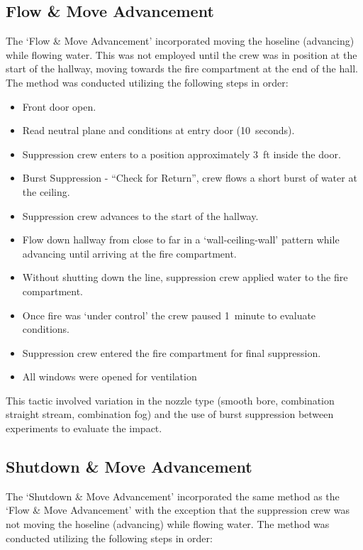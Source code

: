 \documentclass[12pt,oneside]{book}
\begin{document}
\subsection{Flow \& Move Advancement}
The `Flow \& Move Advancement' incorporated moving the hoseline (advancing) while flowing water. This was not employed until the crew was in position at the start of the hallway, moving towards the fire compartment at the end of the hall. The method was conducted utilizing the following steps in order:

\begin{itemize}
	\item{Front door open.}
	\item{Read neutral plane and conditions at entry door (10~seconds).}
	\item{Suppression crew enters to a position approximately 3~ft inside the door.}
	\item{Burst Suppression - ``Check for Return'', crew flows a short burst of water at the ceiling.}
	\item{Suppression crew advances to the start of the hallway.}
	\item{Flow down hallway from close to far in a `wall-ceiling-wall' pattern while advancing until arriving at the fire compartment.}
	\item{Without shutting down the line, suppression crew applied water to the fire compartment.}
	\item{Once fire was `under control' the crew paused 1~minute to evaluate conditions.}
	\item{Suppression crew entered the fire compartment for final suppression.}
	\item{All windows were opened for ventilation}
\end{itemize}

This tactic involved variation in the nozzle type (smooth bore, combination straight stream, combination fog) and the use of burst suppression between experiments to evaluate the impact.

\clearpage

\subsection{Shutdown \& Move Advancement}
The `Shutdown \& Move Advancement' incorporated the same method as the `Flow \& Move Advancement' with the exception that the suppression crew was not moving the hoseline (advancing) while flowing water. The method was conducted utilizing the following steps in order:
\end{document}
